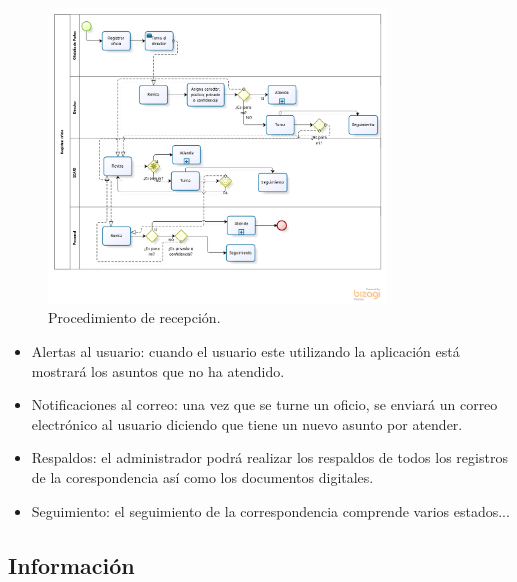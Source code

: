 \begin{figure}[htbp!]
		\centering
			\includegraphics[width=0.8\textwidth]{images/propuesta/registrooficio}
		\caption{Procedimiento de recepción.}
		\label{Registro oficio}
	\end{figure}
	
\begin{itemize}
	\item Alertas al usuario: cuando el usuario este utilizando la aplicación está mostrará los asuntos que no ha atendido. 
	\item Notificaciones al correo: una vez que se turne un oficio, se enviará un correo electrónico al usuario diciendo que tiene un nuevo asunto por atender. 
	\item Respaldos: el administrador podrá realizar los respaldos de todos los registros de la corespondencia así como los documentos digitales.
	\item Seguimiento: el seguimiento de la correspondencia comprende varios estados...
\end{itemize}


\subsection{Información}

